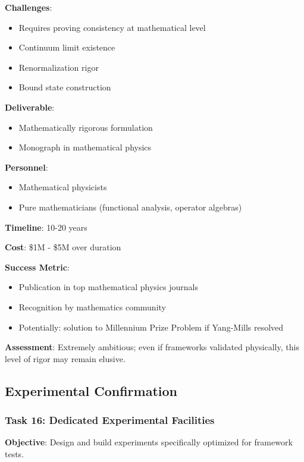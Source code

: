 \textbf{Challenges}:
\begin{itemize}
    \item Requires proving consistency at mathematical level
    \item Continuum limit existence
    \item Renormalization rigor
    \item Bound state construction
\end{itemize}

\textbf{Deliverable}:
\begin{itemize}
    \item Mathematically rigorous formulation
    \item Monograph in mathematical physics
\end{itemize}

\textbf{Personnel}:
\begin{itemize}
    \item Mathematical physicists
    \item Pure mathematicians (functional analysis, operator algebras)
\end{itemize}

\textbf{Timeline}: 10-20 years

\textbf{Cost}: \$1M - \$5M over duration

\textbf{Success Metric}:
\begin{itemize}
    \item Publication in top mathematical physics journals
    \item Recognition by mathematics community
    \item Potentially: solution to Millennium Prize Problem if Yang-Mills resolved
\end{itemize}

\textbf{Assessment}: Extremely ambitious; even if frameworks validated physically, this level of rigor may remain elusive.

\subsection{Experimental Confirmation}

\subsubsection{Task 16: Dedicated Experimental Facilities}

\textbf{Objective}: Design and build experiments specifically optimized for framework tests.

